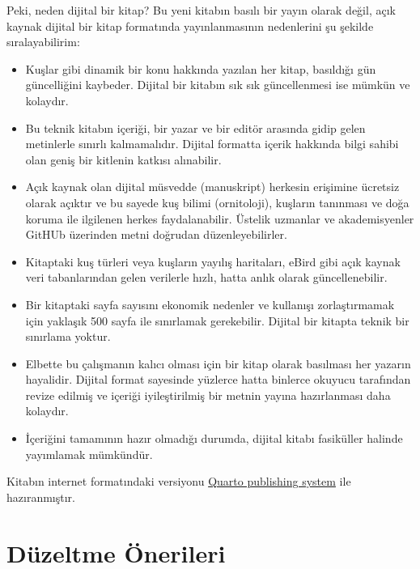 \documentclass[
  letterpaper,
  DIV=11,
  numbers=noendperiod]{scrreprt}
\begin{document}
Peki, neden dijital bir kitap? Bu yeni kitabın basılı bir yayın olarak
değil, açık kaynak dijital bir kitap formatında yayınlanmasının
nedenlerini şu şekilde sıralayabilirim:

\begin{itemize}
\item
  Kuşlar gibi dinamik bir konu hakkında yazılan her kitap, basıldığı gün
  güncelliğini kaybeder. Dijital bir kitabın sık sık güncellenmesi ise
  mümkün ve kolaydır.
\item
  Bu teknik kitabın içeriği, bir yazar ve bir editör arasında gidip
  gelen metinlerle sınırlı kalmamalıdır. Dijital formatta içerik
  hakkında bilgi sahibi olan geniş bir kitlenin katkısı alınabilir.
\item
  Açık kaynak olan dijital müsvedde (manuskript) herkesin erişimine
  ücretsiz olarak açıktır ve bu sayede kuş bilimi (ornitoloji), kuşların
  tanınması ve doğa koruma ile ilgilenen herkes faydalanabilir. Üstelik
  uzmanlar ve akademisyenler GitHUb üzerinden metni doğrudan
  düzenleyebilirler.
\item
  Kitaptaki kuş türleri veya kuşların yayılış haritaları, eBird gibi
  açık kaynak veri tabanlarından gelen verilerle hızlı, hatta anlık
  olarak güncellenebilir.
\item
  Bir kitaptaki sayfa sayısını ekonomik nedenler ve kullanışı
  zorlaştırmamak için yaklaşık 500 sayfa ile sınırlamak gerekebilir.
  Dijital bir kitapta teknik bir sınırlama yoktur.
\item
  Elbette bu çalışmanın kalıcı olması için bir kitap olarak basılması
  her yazarın hayalidir. Dijital format sayesinde yüzlerce hatta
  binlerce okuyucu tarafından revize edilmiş ve içeriği iyileştirilmiş
  bir metnin yayına hazırlanması daha kolaydır.
\item
  İçeriğini tamamının hazır olmadığı durumda, dijital kitabı fasiküller
  halinde yayımlamak mümkündür.
\end{itemize}

Kitabın internet formatındaki versiyonu
\href{https://quarto.org/}{Quarto publishing system} ile hazıranmıştır.

\hypertarget{duxfczeltme-uxf6nerileri}{%
\section*{Düzeltme Önerileri}\label{duxfczeltme-uxf6nerileri}}

\end{document}

